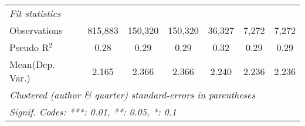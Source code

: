 \begin{tabular}{lcccccc}
   \midrule
   \emph{Fit statistics}\\
   Observations            & 815,883 & 150,320 & 150,320 & 36,327  & 7,272         & 7,272\\  
   Pseudo R$^2$            & 0.28    & 0.29    & 0.29    & 0.32    & 0.29          & 0.29\\  
Mean(Dep. Var.) & 2.165 & 2.366 & 2.366 & 2.240 & 2.236 & 2.236 \\
   \midrule \midrule
   \multicolumn{7}{l}{\emph{Clustered (author \& quarter) standard-errors in parentheses}}\\
   \multicolumn{7}{l}{\emph{Signif. Codes: ***: 0.01, **: 0.05, *: 0.1}}\\
\end{tabular}
\par\endgroup
